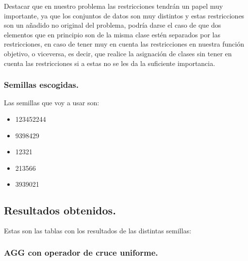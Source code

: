 \documentclass[12pt, spanish]{article}
\begin{document}
Destacar que en nuestro problema las restricciones tendrán un papel muy importante, ya que los conjuntos de datos son muy distintos y estas restricciones son un añadido no original del problema, podría darse el caso de que dos elementos que en principio son de la misma clase estén separados por las restricciones, en caso de tener muy en cuenta las restricciones en nuestra función objetivo, o viceversa, es decir, que realice la asignación de clases sin tener en cuenta las restricciones si a estas no se les da la suficiente importancia.



\subsubsection{Semillas escogidas.}

Las semillas que voy a usar son:

\begin{itemize}
	\item {123452244}
	\item {9398429}
	\item {12321}
	\item {213566}
	\item {3939021}
\end{itemize}

\newpage


\subsection{Resultados obtenidos.}

Estas son las tablas con los resultados de las distintas semillas:



\subsubsection{AGG con operador de cruce uniforme.}
\end{document}
